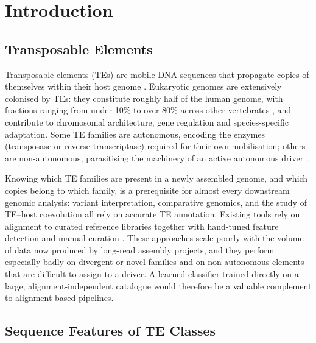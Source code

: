 \documentclass[12pt]{article}
\begin{document}
\newpage
\section{Introduction}

\subsection{Transposable Elements}

Transposable elements (TEs) are mobile DNA sequences that propagate copies of themselves within their host genome \cite{mcclintock1950,wells2020field}. Eukaryotic genomes are extensively colonised by TEs: they constitute roughly half of the human genome, with fractions ranging from under 10\% to over 80\% across other vertebrates \cite{wells2020field}, and contribute to chromosomal architecture, gene regulation and species-specific adaptation. Some TE families are autonomous, encoding the enzymes (transposase or reverse transcriptase) required for their own mobilisation; others are non-autonomous, parasitising the machinery of an active autonomous driver \cite{wicker2007unified,wells2020field}.

Knowing which TE families are present in a newly assembled genome, and which copies belong to which family, is a prerequisite for almost every downstream genomic analysis: variant interpretation, comparative genomics, and the study of TE--host coevolution all rely on accurate TE annotation. Existing tools rely on alignment to curated reference libraries together with hand-tuned feature detection and manual curation \cite{smit2015repeatmasker,flynn2020repeatmodeler2}. These approaches scale poorly with the volume of data now produced by long-read assembly projects, and they perform especially badly on divergent or novel families and on non-autonomous elements that are difficult to assign to a driver. A learned classifier trained directly on a large, alignment-independent catalogue would therefore be a valuable complement to alignment-based pipelines.

\subsection{Sequence Features of TE Classes}
\end{document}
